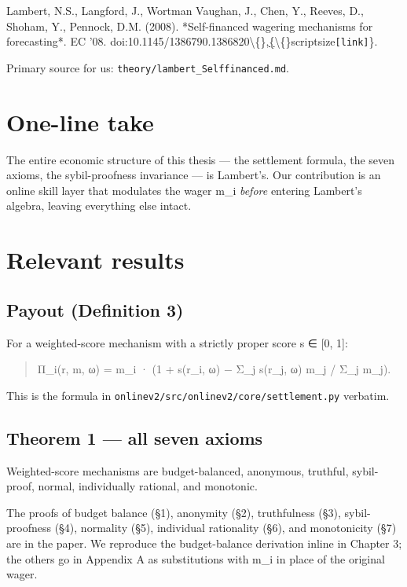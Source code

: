 \documentclass[11pt,a4paper,openany]{report}
\begin{document}
Lambert, N.S., Langford, J., Wortman Vaughan, J., Chen, Y., Reeves, D.,
Shoham, Y., Pennock, D.M. (2008). *Self-financed wagering mechanisms
for forecasting*. EC '08. doi:10.1145/1386790.1386820\textbackslash\{\},\href{https://doi.org/10.1145/1386790.1386820}\{\textbackslash\{\}scriptsize\texttt{[link]}\}.

Primary source for us: \texttt{theory/lambert\_Selffinanced.md}.

\section{One-line take}

The entire economic structure of this thesis — the settlement formula,
the seven axioms, the sybil-proofness invariance — is Lambert's. Our
contribution is an online skill layer that modulates the wager m\_i
\emph{before} entering Lambert's algebra, leaving everything else intact.

\section{Relevant results}

\subsection{Payout (Definition 3)}

For a weighted-score mechanism with a strictly proper score s ∈ [0, 1]:

\begin{quote}
Π\_i(r, m, ω) = m\_i · (1 + s(r\_i, ω) − Σ\_j s(r\_j, ω) m\_j / Σ\_j m\_j).

\end{quote}
This is the formula in \texttt{onlinev2/src/onlinev2/core/settlement.py}
verbatim.

\subsection{Theorem 1 — all seven axioms}

Weighted-score mechanisms are budget-balanced, anonymous, truthful,
sybil-proof, normal, individually rational, and monotonic.

The proofs of budget balance (§1), anonymity (§2), truthfulness (§3),
sybil-proofness (§4), normality (§5), individual rationality (§6), and
monotonicity (§7) are in the paper. We reproduce the budget-balance
derivation inline in Chapter 3; the others go in Appendix A as
substitutions with m\_i in place of the original wager.
\end{document}
